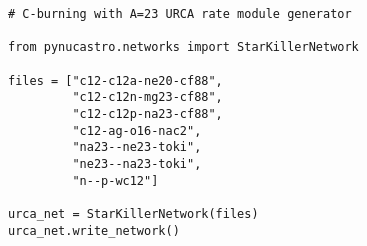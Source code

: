 \documentclass{article}
\begin{document}
\begin{verbatim}
# C-burning with A=23 URCA rate module generator

from pynucastro.networks import StarKillerNetwork

files = ["c12-c12a-ne20-cf88",
         "c12-c12n-mg23-cf88",
         "c12-c12p-na23-cf88",
         "c12-ag-o16-nac2",
         "na23--ne23-toki",
         "ne23--na23-toki",
         "n--p-wc12"]

urca_net = StarKillerNetwork(files)
urca_net.write_network()
\end{verbatim}
\end{document}
